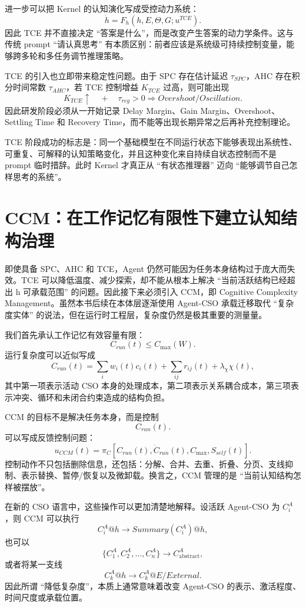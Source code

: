 进一步可以把 Kernel 的认知演化写成受控动力系统：
\[
\dot h
=
F_h(
h,E,\Theta,G;
u^{TCE}
).
\]
因此 TCE 并不直接决定 ``答案是什么''，而是改变产生答案的动力学条件。这与传统 prompt ``请认真思考'' 有本质区别：前者应该是系统级可持续控制变量，能够跨多轮和多任务调节推理策略。

TCE 的引入也立即带来稳定性问题。由于 SPC 存在估计延迟 $\tau_{SPC}$，AHC 存在积分时间常数 $\tau_{AHC}$，若 TCE 控制增益 $K_{TCE}$ 过高，则可能出现
\[
K_{TCE}\uparrow
\quad+\quad
\tau_{reg}>0
\Rightarrow
Overshoot/Oscillation.
\]
因此研发阶段必须从一开始记录 Delay Margin、Gain Margin、Overshoot、Settling Time 和 Recovery Time，而不能等出现长期异常之后再补充控制理论。

TCE 阶段成功的标志是：同一个基础模型在不同运行状态下能够表现出系统性、可重复、可解释的认知策略变化，并且这种变化来自持续自状态控制而不是 prompt 临时措辞。此时 Kernel 才真正从 ``有状态推理器'' 迈向 ``能够调节自己怎样思考的系统''。

\section{CCM：在工作记忆有限性下建立认知结构治理}

即使具备 SPC、AHC 和 TCE，Agent 仍然可能因为任务本身结构过于庞大而失效。TCE 可以降低温度、减少探索，却不能从根本上解决 ``当前活跃结构已经超出 h 可承载范围'' 的问题。因此接下来必须引入 CCM，即 Cognitive Complexity Management。虽然本书后续在本体层逐渐使用 Agent-CSO 承载迁移取代 ``复杂度实体'' 的说法，但在运行时工程层，复杂度仍然是极其重要的测量量。

我们首先承认工作记忆有效容量有限：
\[
C_{run}(t)
\leq
C_{\max}(W).
\]
运行复杂度可以近似写成
\[
C_{run}(t)
=
\sum_i w_i(t)c_i(t)
+
\sum_{ij}r_{ij}(t)
+
\lambda_\chi \chi(t),
\]
其中第一项表示活动 CSO 本身的处理成本，第二项表示关系耦合成本，第三项表示冲突、循环和未闭合约束造成的结构负担。

CCM 的目标不是解决任务本身，而是控制
\[
C_{run}(t).
\]
可以写成反馈控制问题：
\[
u_{CCM}(t)
=
\pi_C
\left[
C_{run}(t),
\dot C_{run}(t),
C_{\max},
S_{self}(t)
\right].
\]
控制动作不只包括删除信息，还包括：分解、合并、去重、折叠、分页、支线抑制、表示替换、暂停/恢复以及微卸载。换言之，CCM 管理的是 ``当前认知结构怎样被摆放''。

在新的 CSO 语言中，这些操作可以更加清楚地解释。设活跃 Agent-CSO 为 $C_i^A$，则 CCM 可以执行
\[
C_i^A@h
\rightarrow
Summary(C_i^A)@h,
\]
也可以
\[
\{C_1^A,C_2^A,\ldots,C_n^A\}
\rightarrow
C_{\mathrm{abstract}}^A,
\]
或者将某一支线
\[
C_k^A@h
\rightarrow
C_k^A@E/External.
\]
因此所谓 ``降低复杂度''，本质上通常意味着改变 Agent-CSO 的表示、激活程度、时间尺度或承载位置。

